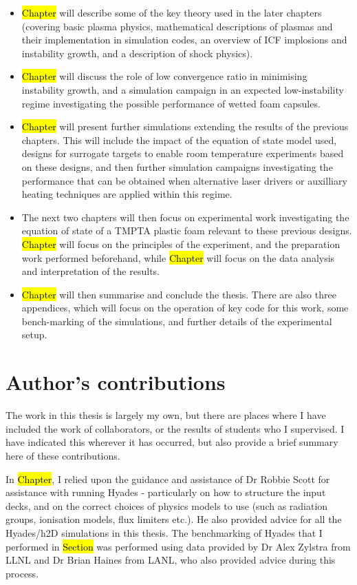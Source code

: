 \begin{itemize}
	\item \hl{Chapter} will describe some of the key theory used in the later chapters (covering basic plasma physics, mathematical descriptions of plasmas and their implementation in simulation codes, an overview of ICF implosions and instability growth, and a description of shock physics).
	\item \hl{Chapter} will discuss the role of low convergence ratio in minimising instability growth, and a simulation campaign in an expected low-instability regime investigating the possible performance of wetted foam capsules.
	\item \hl{Chapter} will present further simulations extending the results of the previous chapters. This will include the impact of the equation of state model used, designs for surrogate targets to enable room temperature experiments based on these designs, and then further simulation campaigns investigating the performance that can be obtained when alternative laser drivers or auxilliary heating techniques are applied within this regime.
	\item The next two chapters will then focus on experimental work investigating the equation of state of a TMPTA plastic foam relevant to these previous designs. \hl{Chapter} will focus on the principles of the experiment, and the preparation work performed beforehand, while \hl{Chapter} will focus on the data analysis and interpretation of the results.
	\item \hl{Chapter} will then summarise and conclude the thesis. There are also three appendices, which will focus on the operation of key code for this work, some bench-marking of the simulations, and further details of the experimental setup.
\end{itemize}

\section{Author's contributions}

The work in this thesis is largely my own, but there are places where I have included the work of collaborators, or the results of students who I supervised. I have indicated this wherever it has occurred, but also provide a brief summary here of these contributions.

In \hl{Chapter}, I relied upon the guidance and assistance of Dr Robbie Scott for assistance with running Hyades - particularly on how to structure the input decks, and on the correct choices of physics models to use (such as radiation groups, ionisation models, flux limiters etc.). He also provided advice for all the Hyades/h2D simulations in this thesis. The benchmarking of Hyades that I performed in \hl{Section} was performed using data provided by Dr Alex Zylstra from LLNL and Dr Brian Haines from LANL, who also provided advice during this process.

